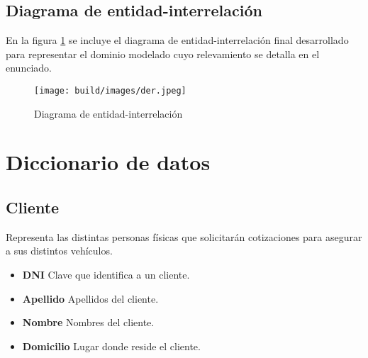 \documentclass[a4paper,11pt]{article}
\begin{document}
\subsection{Diagrama de entidad-interrelación}

 En la figura \ref{fig:der} se incluye el diagrama de entidad-interrelación
 final desarrollado para representar el dominio modelado cuyo relevamiento se
 detalla en el enunciado.

\begin{figure}[h!t]
  \centering
  \texttt{[image: build/images/der.jpeg]}
  \caption{Diagrama de entidad-interrelación} \label{fig:der}
\end{figure}

\FloatBarrier





  

\section{Diccionario de datos}

\subsection{Cliente}

Representa las distintas personas físicas que solicitarán cotizaciones para asegurar 
a sus distintos vehículos.

\begin{itemize}

  \item \textbf{DNI} Clave que identifica a un cliente.
  
  \item \textbf{Apellido} Apellidos del cliente.

  \item \textbf{Nombre} Nombres del cliente.
  
  \item \textbf{Domicilio} Lugar donde reside el cliente.
  
\end{itemize}
\end{document}

